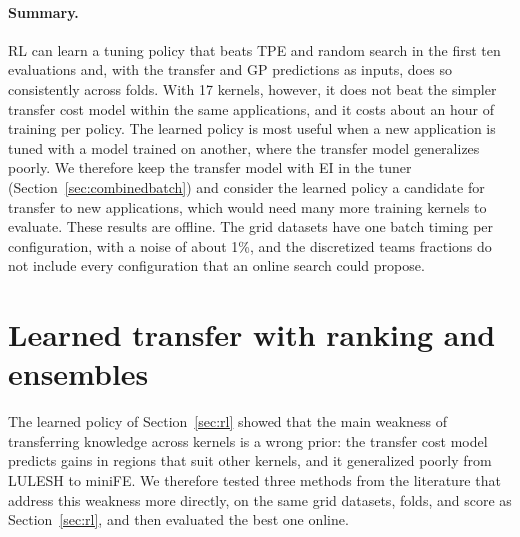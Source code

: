 \documentclass[10pt]{article}
\begin{document}
\paragraph{Summary.} RL can learn a tuning policy that beats TPE and random
search in the first ten evaluations and, with the transfer and GP predictions
as inputs, does so consistently across folds. With 17 kernels, however, it
does not beat the simpler transfer cost model within the same applications,
and it costs about an hour of training per policy. The learned policy is
most useful when a new application is tuned with a model trained on another,
where the transfer model generalizes poorly. We therefore keep the transfer
model with EI in the tuner (Section~\ref{sec:combinedbatch}) and consider the
learned policy a candidate for transfer to new applications, which would need
many more training kernels to evaluate. These results are offline. The
grid datasets have one batch timing per configuration, with a noise of about
1\%, and the discretized teams fractions do not include every configuration
that an online search could propose.

\section{Learned transfer with ranking and ensembles}
\label{sec:learnedtransfer}

The learned policy of Section~\ref{sec:rl} showed that the main weakness of
transferring knowledge across kernels is a wrong prior: the transfer cost model
predicts gains in regions that suit other kernels, and it generalized poorly
from LULESH to miniFE. We therefore tested three methods from the literature
that address this weakness more directly, on the same grid datasets,
folds, and score as Section~\ref{sec:rl}, and then evaluated the best one
online.
\end{document}
